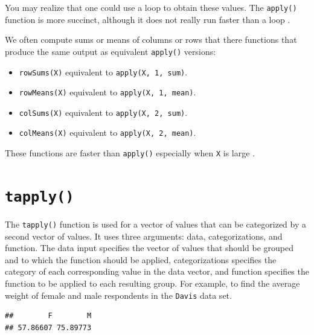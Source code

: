 \documentclass[
]{book}
\newenvironment{Shaded}{\begin{snugshade}}{\end{snugshade}}
\newcommand{\FunctionTok}[1]{\textcolor[rgb]{0.13,0.29,0.53}{\textbf{#1}}}
\newcommand{\NormalTok}[1]{#1}
\newcommand{\SpecialCharTok}[1]{\textcolor[rgb]{0.81,0.36,0.00}{\textbf{#1}}}
\providecommand{\tightlist}{%
  \setlength{\itemsep}{0pt}\setlength{\parskip}{0pt}}
\theoremstyle{definition}
\theoremstyle{definition}
\theoremstyle{definition}
\theoremstyle{definition}
\theoremstyle{remark}
\begin{document}
You may realize that one could use a loop to obtain these values. The \texttt{apply()} function is more succinct, although it does not really run faster than a loop \citep{peng2015}.

We often compute sums or means of columns or rows that there functions that produce the same output as equivalent \texttt{apply()} versions:

\begin{itemize}
\tightlist
\item
  \texttt{rowSums(X)} equivalent to \texttt{apply(X,\ 1,\ sum)}.
\item
  \texttt{rowMeans(X)} equivalent to \texttt{apply(X,\ 1,\ mean)}.
\item
  \texttt{colSums(X)} equivalent to \texttt{apply(X,\ 2,\ sum)}.
\item
  \texttt{colMeans(X)} equivalent to \texttt{apply(X,\ 2,\ mean)}.
\end{itemize}

These functions are faster than \texttt{apply()} especially when \texttt{X} is large \citep{peng2015}.

\hypertarget{tapply}{%
\section{\texorpdfstring{\texttt{tapply()}}{tapply()}}\label{tapply}}

The \texttt{tapply()} function is used for a vector of values that can be categorized by a second vector of values. It uses three arguments: data, categorizations, and function. The data input specifies the vector of values that should be grouped and to which the function should be applied, categorizations specifies the category of each corresponding value in the data vector, and function specifies the function to be applied to each resulting group. For example, to find the average weight of female and male respondents in the \texttt{Davis} data set.

\begin{Shaded}
\end{Shaded}

\begin{verbatim}
##        F        M 
## 57.86607 75.89773
\end{verbatim}
\end{document}
